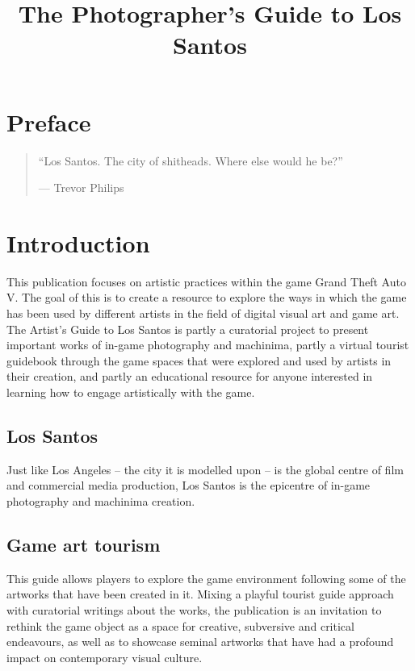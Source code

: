 \documentclass[
  openany]{book}
\title{The Photographer's Guide to Los Santos}
\author{}
\date{\vspace{-2.5em}}
\begin{document}
\maketitle

{
\setcounter{tocdepth}{1}
\tableofcontents
}
\hypertarget{preface}{%
\chapter*{Preface}\label{preface}}

\begin{quote}
``Los Santos. The city of shitheads. Where else would he be?''

--- Trevor Philips
\end{quote}

\hypertarget{introduction}{%
\chapter{Introduction}\label{introduction}}

This publication focuses on artistic practices within the game Grand Theft Auto V. The goal of this is to create a resource to explore the ways in which the game has been used by different artists in the field of digital visual art and game art.
The Artist's Guide to Los Santos is partly a curatorial project to present important works of in-game photography and machinima, partly a virtual tourist guidebook through the game spaces that were explored and used by artists in their creation, and partly an educational resource for anyone interested in learning how to engage artistically with the game.

\hypertarget{los-santos}{%
\section{Los Santos}\label{los-santos}}

Just like Los Angeles -- the city it is modelled upon -- is the global centre of film and commercial media production, Los Santos is the epicentre of in-game photography and machinima creation.

\hypertarget{game-art-tourism}{%
\section{Game art tourism}\label{game-art-tourism}}

This guide allows players to explore the game environment following some of the artworks that have been created in it. Mixing a playful tourist guide approach with curatorial writings about the works, the publication is an invitation to rethink the game object as a space for creative, subversive and critical endeavours, as well as to showcase seminal artworks that have had a profound impact on contemporary visual culture.
\end{document}
